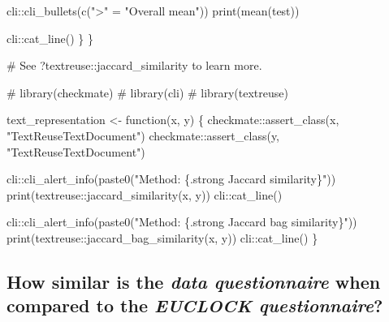 \documentclass[
  12pt,
  a4paper,
  oneside]{tesesusp}
\newenvironment{Shaded}{\begin{snugshade}}{\end{snugshade}}
\newcommand{\CommentTok}[1]{\textcolor[rgb]{0.37,0.37,0.37}{#1}}
\newcommand{\ControlFlowTok}[1]{\textcolor[rgb]{0.00,0.23,0.31}{#1}}
\newcommand{\FunctionTok}[1]{\textcolor[rgb]{0.28,0.35,0.67}{#1}}
\newcommand{\NormalTok}[1]{\textcolor[rgb]{0.00,0.23,0.31}{#1}}
\newcommand{\OtherTok}[1]{\textcolor[rgb]{0.00,0.23,0.31}{#1}}
\newcommand{\SpecialCharTok}[1]{\textcolor[rgb]{0.37,0.37,0.37}{#1}}
\newcommand{\StringTok}[1]{\textcolor[rgb]{0.13,0.47,0.30}{#1}}
\begin{document}
\begin{Shaded}
\begin{Highlighting}[numbers=left,,]
\NormalTok{    cli}\SpecialCharTok{::}\FunctionTok{cli\_bullets}\NormalTok{(}\FunctionTok{c}\NormalTok{(}\StringTok{"\textgreater{}"} \OtherTok{=} \StringTok{"Overall mean"}\NormalTok{))}
    \FunctionTok{print}\NormalTok{(}\FunctionTok{mean}\NormalTok{(test))}
    
\NormalTok{    cli}\SpecialCharTok{::}\FunctionTok{cat\_line}\NormalTok{()}
\NormalTok{  \}}
\NormalTok{\}}
\end{Highlighting}
\end{Shaded}

\begin{Shaded}
\begin{Highlighting}[numbers=left,,]
\CommentTok{\# See \textasciigrave{}?textreuse::jaccard\_similarity\textasciigrave{} to learn more.}

\CommentTok{\# library(checkmate)}
\CommentTok{\# library(cli)}
\CommentTok{\# library(textreuse)}

\NormalTok{text\_representation }\OtherTok{\textless{}{-}} \ControlFlowTok{function}\NormalTok{(x, y) \{}
\NormalTok{  checkmate}\SpecialCharTok{::}\FunctionTok{assert\_class}\NormalTok{(x, }\StringTok{"TextReuseTextDocument"}\NormalTok{)}
\NormalTok{  checkmate}\SpecialCharTok{::}\FunctionTok{assert\_class}\NormalTok{(y, }\StringTok{"TextReuseTextDocument"}\NormalTok{)}
  
\NormalTok{  cli}\SpecialCharTok{::}\FunctionTok{cli\_alert\_info}\NormalTok{(}\FunctionTok{paste0}\NormalTok{(}\StringTok{"Method: \{.strong Jaccard similarity\}"}\NormalTok{))}
  \FunctionTok{print}\NormalTok{(textreuse}\SpecialCharTok{::}\FunctionTok{jaccard\_similarity}\NormalTok{(x, y))}
\NormalTok{  cli}\SpecialCharTok{::}\FunctionTok{cat\_line}\NormalTok{()}
  
\NormalTok{  cli}\SpecialCharTok{::}\FunctionTok{cli\_alert\_info}\NormalTok{(}\FunctionTok{paste0}\NormalTok{(}\StringTok{"Method: \{.strong Jaccard bag similarity\}"}\NormalTok{))}
  \FunctionTok{print}\NormalTok{(textreuse}\SpecialCharTok{::}\FunctionTok{jaccard\_bag\_similarity}\NormalTok{(x, y))}
\NormalTok{  cli}\SpecialCharTok{::}\FunctionTok{cat\_line}\NormalTok{()}
\NormalTok{\}}
\end{Highlighting}
\end{Shaded}

\hypertarget{how-similar-is-the-data-questionnaire-when-compared-to-the-euclock-questionnaire}{%
\subsection{\texorpdfstring{How similar is the \emph{data questionnaire}
when compared to the \emph{EUCLOCK
questionnaire}?}{How similar is the data questionnaire when compared to the EUCLOCK questionnaire?}}\label{how-similar-is-the-data-questionnaire-when-compared-to-the-euclock-questionnaire}}
\end{document}
